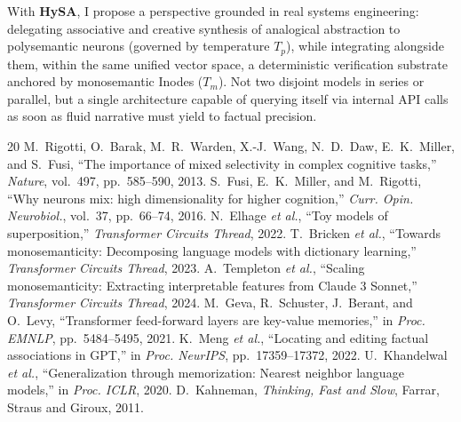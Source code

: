 \documentclass[11pt,a4paper]{article}
\theoremstyle{definition}
\begin{document}
With \textbf{HySA}, I propose a perspective grounded in real systems engineering: delegating associative and creative synthesis of analogical abstraction to polysemantic neurons (governed by temperature $T_p$), while integrating alongside them, within the same unified vector space, a deterministic verification substrate anchored by monosemantic Inodes ($T_m$). Not two disjoint models in series or parallel, but a single architecture capable of querying itself via internal API calls as soon as fluid narrative must yield to factual precision.

\begin{thebibliography}{20}
\small
{} M.~Rigotti, O.~Barak, M.~R.~Warden, X.-J.~Wang, N.~D.~Daw, E.~K.~Miller, and S.~Fusi, ``The importance of mixed selectivity in complex cognitive tasks,'' \textit{Nature}, vol.~497, pp.~585--590, 2013.
 S.~Fusi, E.~K.~Miller, and M.~Rigotti, ``Why neurons mix: high dimensionality for higher cognition,'' \textit{Curr. Opin. Neurobiol.}, vol.~37, pp.~66--74, 2016.
 N.~Elhage \textit{et al.}, ``Toy models of superposition,'' \textit{Transformer Circuits Thread}, 2022.
 T.~Bricken \textit{et al.}, ``Towards monosemanticity: Decomposing language models with dictionary learning,'' \textit{Transformer Circuits Thread}, 2023.
 A.~Templeton \textit{et al.}, ``Scaling monosemanticity: Extracting interpretable features from Claude 3 Sonnet,'' \textit{Transformer Circuits Thread}, 2024.
 M.~Geva, R.~Schuster, J.~Berant, and O.~Levy, ``Transformer feed-forward layers are key-value memories,'' in \textit{Proc. EMNLP}, pp.~5484--5495, 2021.
 K.~Meng \textit{et al.}, ``Locating and editing factual associations in GPT,'' in \textit{Proc. NeurIPS}, pp.~17359--17372, 2022.
 U.~Khandelwal \textit{et al.}, ``Generalization through memorization: Nearest neighbor language models,'' in \textit{Proc. ICLR}, 2020.
 D.~Kahneman, \textit{Thinking, Fast and Slow}, Farrar, Straus and Giroux, 2011.
\end{thebibliography}
\end{document}
